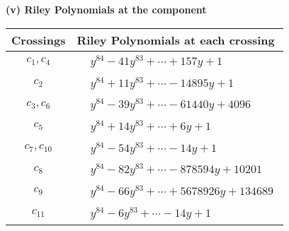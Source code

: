 \documentclass[1p]{elsarticle_modified}
\theoremstyle{definition}
\begin{document}
\newpage\renewcommand{\arraystretch}{1}
\flushleft \textbf{(v) Riley Polynomials at the component}\newline \\
\begin{tabular}{m{50pt}|m{274pt}}
Crossings & \hspace{64pt}Riley Polynomials at each crossing \\
\hline $$\begin{aligned}c_{1},c_{4}\end{aligned}$$&$\begin{aligned}
&y^{84}-41 y^{83}+\cdots+157 y+1
\end{aligned}$\\
\hline $$\begin{aligned}c_{2}\end{aligned}$$&$\begin{aligned}
&y^{84}+11 y^{83}+\cdots-14895 y+1
\end{aligned}$\\
\hline $$\begin{aligned}c_{3},c_{6}\end{aligned}$$&$\begin{aligned}
&y^{84}-39 y^{83}+\cdots-61440 y+4096
\end{aligned}$\\
\hline $$\begin{aligned}c_{5}\end{aligned}$$&$\begin{aligned}
&y^{84}+14 y^{83}+\cdots+6 y+1
\end{aligned}$\\
\hline $$\begin{aligned}c_{7},c_{10}\end{aligned}$$&$\begin{aligned}
&y^{84}-54 y^{83}+\cdots-14 y+1
\end{aligned}$\\
\hline $$\begin{aligned}c_{8}\end{aligned}$$&$\begin{aligned}
&y^{84}-82 y^{83}+\cdots-878594 y+10201
\end{aligned}$\\
\hline $$\begin{aligned}c_{9}\end{aligned}$$&$\begin{aligned}
&y^{84}-66 y^{83}+\cdots+5678926 y+134689
\end{aligned}$\\
\hline $$\begin{aligned}c_{11}\end{aligned}$$&$\begin{aligned}
&y^{84}-6 y^{83}+\cdots-14 y+1
\end{aligned}$\\
\hline
\end{tabular}\\~\\
\end{document}
